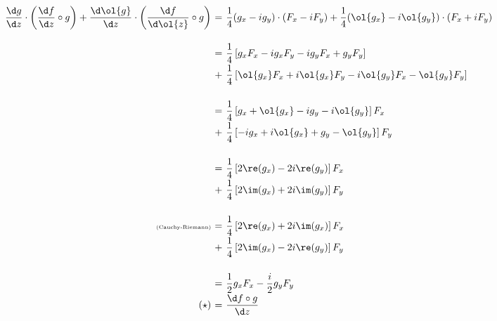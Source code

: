 \[ \everymath{\displaystyle}
\arraycolsep=1.8pt\def\arraystretch{1.8}
\begin{array}{rcl}
    \frac{\d g}{\d z}\cdot\left( \frac{\d f}{\d z} \circ g \right) + \frac{\d \ol{g}}{\d z}\cdot \left( \frac{\d f}{\d \ol{z}} \circ g \right) & = & \frac{1}{4} (g_x - i g_y) \cdot (F_x - i F_y) + \frac{1}{4} (\ol{g_x} - i \ol{g_y} )\cdot \left( F_x + i F_y \right)\\[1.5em]

    & = & \frac{1}{4}\left[ g_x F_x - i g_x F_y - i g_y F_x +g_y F_y \right]\\
    & + & \frac{1}{4}\left[ \ol{g_x} F_x + i \ol{g_x} F_y - i \ol{g_y} F_x - \ol{g_y} F_y \right]\\[1.5em]

    & = & \frac{1}{4}\left[ g_x + \ol{g_x} - i g_y - i \ol{g_y} \right]F_x\\
    & + & \frac{1}{4}\left[ -ig_x + i \ol{g_x} + g_y - \ol{g_y} \right]F_y\\[1.5em]

    & = & \frac{1}{4}\left[ 2\re(g_x) - 2i \re(g_y)  \right]F_x\\
    & + & \frac{1}{4}\left[ 2\im(g_x) + 2i \im(g_y)  \right]F_y\\[1.5em]

    \mbox{\tiny{(Cauchy-Riemann)}} & = & \frac{1}{4}\left[ 2\re(g_x) + 2i\im(g_x)  \right]F_x\\
    & + & \frac{1}{4}\left[ 2\im(g_x) - 2i \re(g_y)  \right]F_y\\[1.5em]

    & = & \frac{1}{2}g_x F_x - \frac{i}{2} g_y F_y\\
    (\star) & = & \frac{\d f\circ g}{\d z}

\end{array} \]




